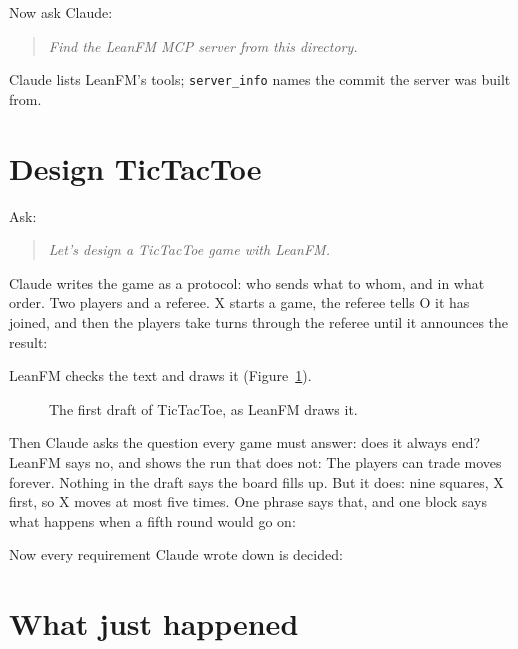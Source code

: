 Now ask Claude:
\begin{quote}
\emph{Find the LeanFM MCP server from this directory.}
\end{quote}
Claude lists LeanFM's tools; \texttt{server\_info} names the commit the server was built from.

\section{Design TicTacToe}

Ask:
\begin{quote}
\emph{Let's design a TicTacToe game with LeanFM.}
\end{quote}
Claude writes the game as a protocol: who sends what to whom, and in what order. Two players
and a referee. X starts a game, the referee tells O it has joined, and then the players take
turns through the referee until it announces the result:

LeanFM checks the text and draws it (Figure~\ref{fig:ttt}).

\begin{figure}[ht]
\centering
{}
\caption{The first draft of TicTacToe, as LeanFM draws it.}
\label{fig:ttt}
\end{figure}

Then Claude asks the question every game must answer: does it always end? LeanFM says no, and
shows the run that does not:
The players can trade moves forever. Nothing in the draft says the board fills up. But it
does: nine squares, X first, so X moves at most five times. One phrase says that, and one
block says what happens when a fifth round would go on:

Now every requirement Claude wrote down is decided:
\begin{center}
\end{center}

\section{What just happened}


